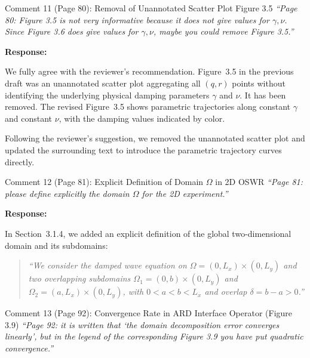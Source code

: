 \documentclass[11pt,a4paper]{article}
\newenvironment{response}{
    \par\vspace{1mm}\noindent\textbf{\textcolor{responseframe}{Response:}}\par\vspace{1mm}
}{
    \par\vspace{3mm}
}
\begin{document}
\vspace{2mm}
\begin{revcomment}{Comment 11 (Page 80): Removal of Unannotated Scatter Plot Figure 3.5}
\emph{``Page 80: Figure 3.5 is not very informative because it does not give values for $\gamma, \nu$. Since Figure 3.6 does give values for $\gamma, \nu$, maybe you could remove Figure 3.5.''}
\end{revcomment}

\begin{response}
We fully agree with the reviewer's recommendation. Figure~3.5 in the previous draft was an unannotated scatter plot aggregating all $(q, r)$ points without identifying the underlying physical damping parameters $\gamma$ and $\nu$. It has been removed. The revised Figure~3.5 shows parametric trajectories along constant $\gamma$ and constant $\nu$, with the damping values indicated by color.

Following the reviewer's suggestion, we removed the unannotated scatter plot and updated the surrounding text to introduce the parametric trajectory curves directly.
\end{response}

\vspace{2mm}
\begin{revcomment}{Comment 12 (Page 81): Explicit Definition of Domain $\Omega$ in 2D OSWR}
\emph{``Page 81: please define explicitly the domain $\Omega$ for the 2D experiment.''}
\end{revcomment}

\begin{response}
In Section~3.1.4, we added an explicit definition of the global two-dimensional domain and its subdomains:
\begin{quote}
\emph{``We consider the damped wave equation on $\Omega = (0, L_x) \times (0, L_y)$ and two overlapping subdomains $\Omega_1 = (0, b) \times (0, L_y)$ and $\Omega_2 = (a, L_x) \times (0, L_y)$, with $0 < a < b < L_x$ and overlap $\delta=b-a>0$.''}
\end{quote}
\end{response}

\vspace{2mm}
\begin{revcomment}{Comment 13 (Page 92): Convergence Rate in ARD Interface Operator (Figure 3.9)}
\emph{``Page 92: it is written that `the domain decomposition error converges linearly', but in the legend of the corresponding Figure 3.9 you have put quadratic convergence.''}
\end{revcomment}
\end{document}
